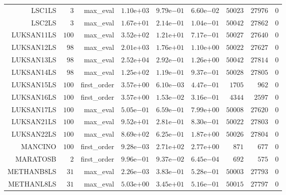\begin{longtable}{rrrrrrrrr}
LSC1LS & \(     3\) & max\_eval & \( 1.10\)e\(+03\) & \( 9.79\)e\(-01\) & \( 6.60\)e\(-02\) & \( 50023\) & \( 27976\) & \(     0\) \\
LSC2LS & \(     3\) & max\_eval & \( 1.67\)e\(+01\) & \( 2.14\)e\(-01\) & \( 1.04\)e\(-01\) & \( 50042\) & \( 27862\) & \(     0\) \\
LUKSAN11LS & \(   100\) & max\_eval & \( 3.52\)e\(+02\) & \( 1.21\)e\(+01\) & \( 7.17\)e\(-01\) & \( 50027\) & \( 27640\) & \(     0\) \\
LUKSAN12LS & \(    98\) & max\_eval & \( 2.01\)e\(+03\) & \( 1.76\)e\(+01\) & \( 1.10\)e\(+00\) & \( 50022\) & \( 27627\) & \(     0\) \\
LUKSAN13LS & \(    98\) & max\_eval & \( 2.52\)e\(+04\) & \( 2.92\)e\(-01\) & \( 1.26\)e\(+00\) & \( 50042\) & \( 27814\) & \(     0\) \\
LUKSAN14LS & \(    98\) & max\_eval & \( 1.25\)e\(+02\) & \( 1.19\)e\(-01\) & \( 9.37\)e\(-01\) & \( 50028\) & \( 27805\) & \(     0\) \\
LUKSAN15LS & \(   100\) & first\_order & \( 3.57\)e\(+00\) & \( 6.10\)e\(-03\) & \( 4.47\)e\(-01\) & \(  1705\) & \(   962\) & \(     0\) \\
LUKSAN16LS & \(   100\) & first\_order & \( 3.57\)e\(+00\) & \( 1.53\)e\(-02\) & \( 3.16\)e\(-01\) & \(  4344\) & \(  2597\) & \(     0\) \\
LUKSAN17LS & \(   100\) & max\_eval & \( 5.05\)e\(-01\) & \( 6.59\)e\(-01\) & \( 7.99\)e\(+00\) & \( 50008\) & \( 27620\) & \(     0\) \\
LUKSAN21LS & \(   100\) & max\_eval & \( 9.52\)e\(+01\) & \( 2.81\)e\(-01\) & \( 8.30\)e\(-01\) & \( 50022\) & \( 27803\) & \(     0\) \\
LUKSAN22LS & \(   100\) & max\_eval & \( 8.69\)e\(+02\) & \( 6.25\)e\(-01\) & \( 1.87\)e\(+00\) & \( 50026\) & \( 27804\) & \(     0\) \\
MANCINO & \(   100\) & first\_order & \( 9.28\)e\(-03\) & \( 2.71\)e\(+02\) & \( 2.77\)e\(+00\) & \(   871\) & \(   677\) & \(     0\) \\
MARATOSB & \(     2\) & first\_order & \( 9.96\)e\(-01\) & \( 9.37\)e\(-02\) & \( 6.45\)e\(-04\) & \(   692\) & \(   575\) & \(     0\) \\
METHANB8LS & \(    31\) & max\_eval & \( 2.26\)e\(-03\) & \( 3.83\)e\(-01\) & \( 5.28\)e\(-01\) & \( 50003\) & \( 27793\) & \(     0\) \\
METHANL8LS & \(    31\) & max\_eval & \( 5.03\)e\(+00\) & \( 3.45\)e\(+01\) & \( 5.16\)e\(-01\) & \( 50015\) & \( 27797\) & \(     0\) \\

\end{longtable}
